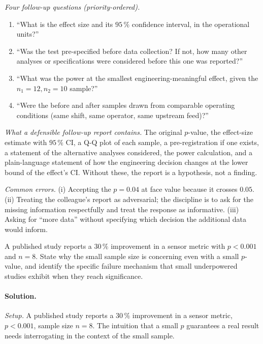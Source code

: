 \textit{Four follow-up questions (priority-ordered).}
\begin{enumerate}[leftmargin=*]
  \item ``What is the effect size and its $95 \,\%$ confidence
    interval, in the operational units?''
  \item ``Was the test pre-specified before data collection? If
    not, how many other analyses or specifications were considered
    before this one was reported?''
  \item ``What was the power at the smallest engineering-meaningful
    effect, given the $n_{1} = 12, n_{2} = 10$ sample?''
  \item ``Were the before and after samples drawn from comparable
    operating conditions (same shift, same operator, same
    upstream feed)?''
\end{enumerate}

\textit{What a defensible follow-up report contains.} The original
$p$-value, the effect-size estimate with $95 \,\%$ CI, a Q-Q plot
of each sample, a pre-registration if one exists, a statement of
the alternative analyses considered, the power calculation, and a
plain-language statement of how the engineering decision changes
at the lower bound of the effect's CI. Without these, the report
is a hypothesis, not a finding.

\textit{Common errors.} (i) Accepting the $p = 0.04$ at face value
because it crosses $0.05$. (ii) Treating the colleague's report as
adversarial; the discipline is to ask for the missing information
respectfully and treat the response as informative. (iii) Asking
for ``more data'' without specifying which decision the additional
data would inform.

\begin{exercise}
A published study reports a $30 \,\%$ improvement in a sensor
metric with $p < 0.001$ and $n = 8$. State why the small sample
size is concerning even with a small $p$-value, and identify the
specific failure mechanism that small underpowered studies
exhibit when they reach significance.
\end{exercise}

\paragraph{Solution.}
\textit{Setup.} A published study reports a $30 \,\%$ improvement in
a sensor metric, $p < 0.001$, sample size $n = 8$. The intuition
that a small $p$ guarantees a real result needs interrogating in
the context of the small sample.


